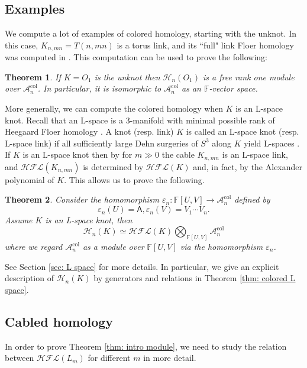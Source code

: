 \documentclass{amsart}
\newtheorem{theorem}{Theorem}[section]
\newcommand{\CA}{\mathcal{A}}
\newcommand{\CH}{\mathcal{H}}
\newcommand{\col}{\mathrm{col}}
\newcommand{\F}{\mathbb{F}}
\newcommand{\cHFL}{\mathcal{H\!F\! L}}
\newcommand{\AAA}{\mathsf{A}}
\begin{document}
\subsection{Examples}

We compute a lot of examples of colored homology, starting with the unknot. In this case, $K_{n,mn}=T(n,mn)$ is a torus link, and its ``full" link Floer homology  was computed in \cite{BLZ}. This computation can be used to prove the following:

\begin{theorem}
\label{thm: intro unknot}
If $K=O_1$ is the unknot then $\CH_{n}(O_1)$ is a free rank one module over $\CA_n^{\col}$. In particular, it is isomorphic to $\CA_n^{\col}$ as an $\F$-vector space.
\end{theorem}

More generally, we can compute the colored homology when $K$ is an L-space knot. Recall that an L-space is a 3-manifold with minimal possible rank of Heegaard Floer homology \cite{OSlens}. A knot (resp. link) $K$ is called an L-space knot (resp. L-space link) if all sufficiently large Dehn surgeries of $S^3$ along $K$ yield L-spaces \cite{Yajing}. If $K$ is an L-space knot then by \cite{GH} for $m\gg 0$ the cable $K_{n,mn}$ is an L-space link, and $\cHFL(K_{n,mn})$ is determined by $\cHFL(K)$ and, in fact, by the Alexander polynomial of $K$. This allows us to prove the following.

\begin{theorem}
\label{thm: intro L space}
Consider the homomorphism $\varepsilon_n:\F[U,V]\to \CA_n^{\col}$ defined by 
$$
\varepsilon_n(U)=\AAA, \varepsilon_n(V)=V_1\cdots V_n.
$$
Assume $K$ is an L-space knot, then 
$$
\CH_{n}(K)\simeq \cHFL(K)\bigotimes_{\F[U,V]}\CA_n^{\col}
$$
where we regard $\CA_n^{\col}$ as a module over $\F[U,V]$ via the homomorphism $\varepsilon_n$.
\end{theorem}



See Section \ref{sec: L space} for more details. In particular, we give an explicit description of $\CH_{n}(K)$ by generators and relations in Theorem \ref{thm: colored L space}.

\subsection{Cabled homology}
\label{cabled homology}
In order to prove Theorem \ref{thm: intro module}, we need to study the relation between $\cHFL(L_m)$ for different $m$ in more detail. 
\end{document}
